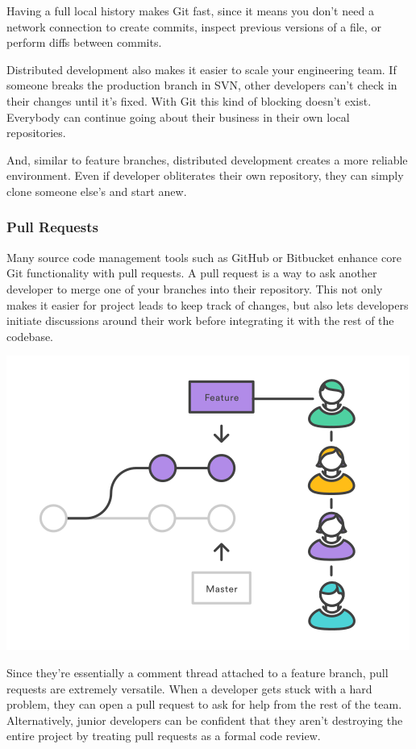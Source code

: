 \documentclass[11pt]{article}
\begin{document}
Having a full local history makes Git fast, since it means you don’t need a network connection to create commits, inspect previous versions of a file, or perform diffs between commits.

Distributed development also makes it easier to scale your engineering team. If someone breaks the production branch in SVN, other developers can’t check in their changes until it’s fixed. With Git this kind of blocking doesn’t exist. Everybody can continue going about their business in their own local repositories.

And, similar to feature branches, distributed development creates a more reliable environment. Even if developer obliterates their own repository, they can simply clone someone else’s and start anew.
\subsubsection{Pull Requests}
\label{sec:orga2bd231}
Many source code management tools such as GitHub or Bitbucket enhance core Git functionality with pull requests. A pull request is a way to ask another developer to merge one of your branches into their repository. This not only makes it easier for project leads to keep track of changes, but also lets developers initiate discussions around their work before integrating it with the rest of the codebase.

\begin{center}
\includegraphics[width=.9\linewidth]{./img/4.png}
\end{center}

Since they're essentially a comment thread attached to a feature branch, pull requests are extremely versatile. When a developer gets stuck with a hard problem, they can open a pull request to ask for help from the rest of the team. Alternatively, junior developers can be confident that they aren't destroying the entire project by treating pull requests as a formal code review.
\end{document}
